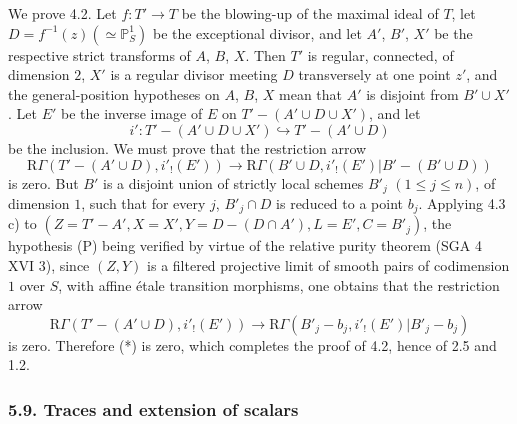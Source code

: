 \documentclass[11pt]{article}
\begin{document}
We prove 4.2. Let $f:T'\to T$ be the blowing-up of the maximal ideal of $T$, let $D=f^{-1}(z)(\simeq\mathbb P^1_S)$ be the exceptional divisor, and let $A'$, $B'$, $X'$ be the respective strict transforms of $A$, $B$, $X$. Then $T'$ is regular, connected, of dimension $2$, $X'$ is a regular divisor meeting $D$ transversely at one point $z'$, and the general-position hypotheses on $A$, $B$, $X$ mean that $A'$ is disjoint from $B'\cup X'$. Let $E'$ be the inverse image of $E$ on $T'-(A'\cup D\cup X')$, and let
\[
i':T'-(A'\cup D\cup X')\hookrightarrow T'-(A'\cup D)
\]
be the inclusion. We must prove that the restriction arrow
\begin{equation}
\mathrm R\Gamma(T'-(A'\cup D),i'_!(E'))
\longrightarrow
\mathrm R\Gamma(B'\cup D,i'_!(E')|B'-(B'\cup D))
\tag{*}
\end{equation}
is zero. But $B'$ is a disjoint union of strictly local schemes $B'_j$ $(1\le j\le n)$, of dimension $1$, such that for every $j$, $B'_j\cap D$ is reduced to a point $b_j$. Applying 4.3 c) to $(Z=T'-A', X=X', Y=D-(D\cap A'), L=E', C=B'_j)$, the hypothesis (P) being verified by virtue of the relative purity theorem (SGA 4 XVI 3), since $(Z,Y)$ is a filtered projective limit of smooth pairs of codimension $1$ over $S$, with affine étale transition morphisms, one obtains that the restriction arrow
\[
\mathrm R\Gamma(T'-(A'\cup D),i'_!(E'))
\longrightarrow
\mathrm R\Gamma(B'_j-b_j,i'_!(E')|B'_j-b_j)
\]
is zero. Therefore (*) is zero, which completes the proof of 4.2, hence of 2.5 and 1.2.

\subsubsection*{5.9. Traces and extension of scalars}
\end{document}
